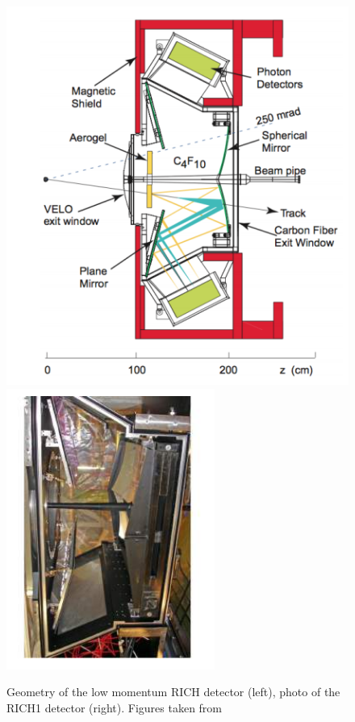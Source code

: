 \begin{figure}[h]
 \begin{center}
  \includegraphics[width=0.49\linewidth]{figures/RICH1.PNG}
   \includegraphics[width=0.49\linewidth]{figures/RICH1_photo.PNG}
    \caption{Geometry of the low momentum RICH detector (left), photo of the RICH1 detector (right). Figures taken from~\cite{lhcb}}%
\label{fig:RICH1}%
 \end{center}
\end{figure}


